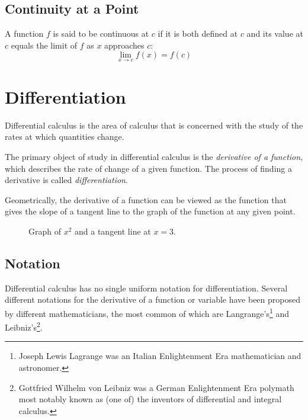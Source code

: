 \documentclass[headings=standardclasses]{scrreprt}
\begin{document}
\section{Continuity at a Point}

A function \(f\) is said to be continuous at \(c\) if it is both defined at
\(c\) and its value at \(c\) equals the limit of \(f\) as \(x\) approaches
\(c\): \[ \lim_{x → c} f(x) = f(c) \]

\chapter{Differentiation}

Differential calculus is the area of calculus that is concerned with the study
of the rates at which quantities change.

The primary object of study in differential calculus is the \emph{derivative of
  a function}, which describes the rate of change of a given function. The
process of finding a derivative is called \emph{differentiation}.

Geometrically, the derivative of a function can be viewed as the function that
gives the slope of a tangent line to the graph of the function at any given
point.

\begin{figure}[h]
  \centering


  \caption{Graph of \(x^{2}\) and a tangent line at \(x = 3\).}
\end{figure}

\section{Notation}

Differential calculus has no single uniform notation for differentiation.
Several different notations for the derivative of a function or variable have
been proposed by different mathematicians, the most common of which are
Langrange's\footnote{Joseph Lewis Lagrange was an Italian Enlightenment Era
  mathematician and astronomer.} and Leibniz's\footnote{Gottfried Wilhelm von
  Leibniz was a German Enlightenment Era polymath most notably known as (one of)
  the inventors of differential and integral calculus.}.
\end{document}
